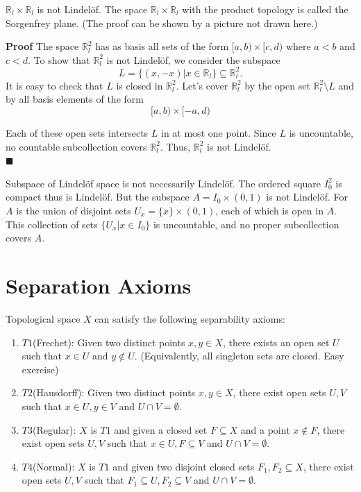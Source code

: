 \documentclass[main.tex]{subfiles}
\begin{document}
\begin{property}
    $\mathbb{R}_l \times \mathbb{R}_l$ is not Lindelöf. The space $\mathbb{R}_l \times \mathbb{R}_l$ with the product topology is called the Sorgenfrey plane. (The proof can be shown by a picture not drawn here.)
\end{property}
\par \noindent \textbf{Proof} 
The space $\mathbb{R}_l^2$ has as basis all sets of the form $[a, b) \times [c, d)$ where $a < b$ and $c < d$. To show that $\mathbb{R}_l^2$ is not Lindelöf, we consider the subspace 
\begin{equation}
    L = \{(x, -x) | x \in \mathbb{R}_l\} \subseteq \mathbb{R}_l^2.
\end{equation}
It is easy to check that $L$ is closed in $\mathbb{R}_l^2$. Let's cover $\mathbb{R}_l^2$ by the open set $\mathbb{R}_l^2 \setminus L$ and by all basis elements of the form  
\begin{equation}
    [a, b) \times [-a, d)
\end{equation}
\par Each of these open sets intersects $L$ in at most one point. Since $L$ is uncountable, no countable subcollection covers $\mathbb{R}_l^2$. Thus, $\mathbb{R}_l^2$ is not Lindelöf. 
\mbox{} \\ \null \hfill $\blacksquare$

\begin{example}
    Subspace of Lindelöf space is not necessarily Lindelöf. The ordered square $I_0^2$ is compact thus is Lindelöf. But the subspace $A = I_0 \times (0, 1)$ is not Lindelöf. For $A$ is the union of disjoint sets $U_x = \{x\} \times (0, 1)$, each of which is open in $A$. This collection of sets $\{U_x | x \in I_0\}$ is uncountable, and no proper subcollection covers $A$.
\end{example}

\section{Separation Axioms}
\par Topological space $X$ can satisfy the following separability axioms:
\begin{enumerate}
    \item $T1$(Frechet): Given two distinct points $x, y \in X$, there exists an open set $U$ such that $x \in U$ and $y \notin U$. (Equivalently, all singleton sets are closed. Easy exercise)
    \item $T2$(Hausdorff): Given two distinct points $x, y \in X$, there exist open sets $U, V$ such that $x \in U, y \in V$ and $U \cap V = \emptyset$.
    \item $T3$(Regular): $X$ is $T1$ and given a closed set $F \subseteq X$ and a point $x \notin F$, there exist open sets $U, V$ such that $x \in U, F \subseteq V$ and $U \cap V = \emptyset$.
    \item $T4$(Normal): $X$ is $T1$ and given two disjoint closed sets $F_1, F_2 \subseteq X$, there exist open sets $U, V$ such that $F_1 \subseteq U, F_2 \subseteq V$ and $U \cap V = \emptyset$.
\end{enumerate}
\end{document}
